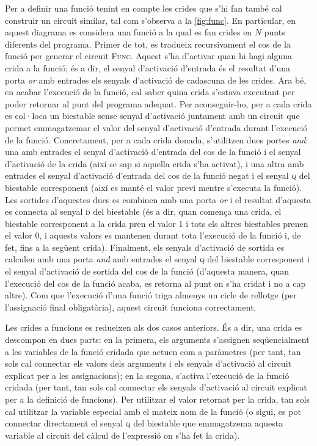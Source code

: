 Per a definir una funció tenint en compte les crides que s'hi fan també cal 
construir un circuit similar, tal com s'observa a la \autoref{fig:func}. En 
particular, en aquest diagrama es considera una funció a la qual es fan crides
en \(N\) punts diferents del programa. Primer de tot, es tradueix 
recursivament el cos de la funció per generar el circuit \textsc{Func}. 
Aquest s'ha d'activar quan hi hagi alguna crida a la funció; és a dir, el 
senyal d'activació d'entrada és el resultat d'una porta \textit{or} amb 
entrades els senyals d'activació de cadascuna de les crides. Ara bé, en 
acabar l'execució de la funció, cal saber quina crida s'estava executant per 
poder retornar al punt del programa adequat. Per aconseguir-ho, per a cada 
crida es col·loca un biestable sense senyal d'activació juntament amb un 
circuit que permet emmagatzemar el valor del senyal d'activació d'entrada 
durant l'execució de la funció. Concretament, per a cada crida donada, 
s'utilitzen dues portes \textit{and}: una amb entrades el senyal d'activació 
d'entrada del cos de la funció i el senyal d'activació de la crida (així se 
sap si aquella crida s'ha activat), i una altra amb entrades el senyal 
d'activació d'entrada del cos de la funció negat i el senyal \textsc{q} del 
biestable corresponent (així es manté el valor previ mentre s'executa la 
funció). Les sortides d'aquestes dues es combinen amb una porta \textit{or} i 
el resultat d'aquesta es connecta al senyal \textsc{d} del biestable (és a dir, 
quan comença una crida, el biestable corresponent a la crida pren el valor 1 
i tots els altres biestables prenen el valor 0, i aquests valors es mantenen 
durant tota l'execució de la funció i, de fet, fins a la següent crida). 
Finalment, els senyals d'activació de sortida es calculen amb una porta 
\textit{and} amb entrades el senyal \textsc{q} del biestable corresponent i 
el senyal d'activació de sortida del cos de la funció (d'aquesta manera, quan 
l'execució del cos de la funció acaba, es retorna al punt on s'ha cridat i no 
a cap altre). Com que l'execució d'una funció triga almenys un cicle de 
rellotge (per l'assignació final obligatòria), aquest circuit funciona 
correctament. 

Les crides a funcions es redueixen als dos casos anteriors. És a dir, una 
crida es descompon en dues parts: en la primera, els arguments s'assignen 
seqüencialment a les variables de la funció cridada que actuen com a 
paràmetres (per tant, tan sols cal connectar els valors dels arguments i els 
senyals d'activació al circuit explicat per a les assignacions); en la segona, 
s'activa l'execució de la funció cridada (per tant, tan sols cal connectar 
els senyals d'activació al circuit explicat per a la definició de funcions). 
Per utilitzar el valor retornat per la crida, tan sols cal utilitzar la 
variable especial amb el mateix nom de la funció (o sigui, es pot connectar 
directament el senyal \textsc{q} del biestable que emmagatzema aquesta 
variable al circuit del càlcul de l'expressió on s'ha fet la crida).

